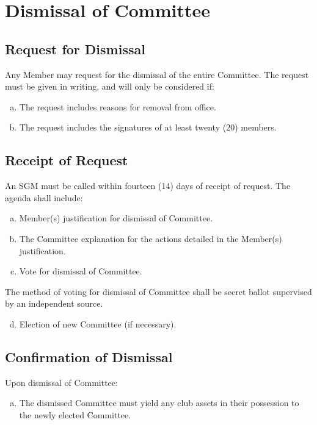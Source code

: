 \documentclass[a4paper,12pt]{article}
\begin{document}
\section{Dismissal of Committee}

\subsection{Request for Dismissal}

Any Member may request for the dismissal of the entire Committee. The request must be given in writing, and will only be considered if:

\begin{enumerate}[a)]
	\item The request includes reasons for removal from office.
	\item The request includes the signatures of at least twenty (20) members.
\end{enumerate}

\subsection{Receipt of Request}

An SGM must be called within fourteen (14) days of receipt of request. The agenda shall include:

\begin{enumerate}[a)]
	\item Member(s) justification for dismissal of Committee.
	\item The Committee explanation for the actions detailed in the Member(s) justification.
	\item Vote for dismissal of Committee.
\end{enumerate}

The method of voting for dismissal of Committee shall be secret ballot supervised by an independent source.

\begin{enumerate}[a)]
	\setcounter{enumi}{3}
	\item Election of new Committee (if necessary).
\end{enumerate}

\subsection{Confirmation of Dismissal}

Upon dismissal of Committee:

\begin{enumerate}[a)]
	\item The dismissed Committee must yield any club assets in their possession to the newly elected Committee.
\end{enumerate}
\end{document}
